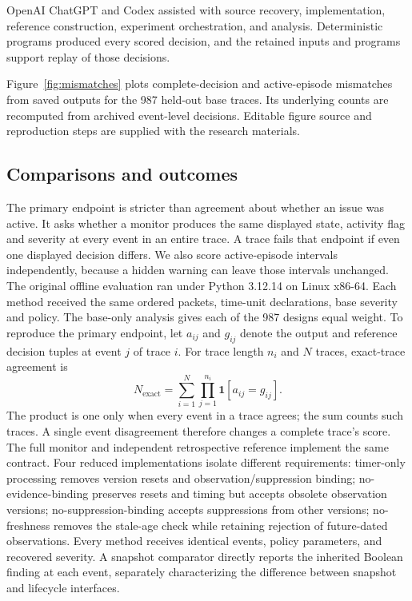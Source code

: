 \documentclass[preprint,11pt]{elsarticle}
\begin{document}
OpenAI ChatGPT and Codex assisted with source recovery, implementation, reference construction, experiment orchestration, and analysis. Deterministic programs produced every scored decision, and the retained inputs and programs support replay of those decisions.

Figure~\ref{fig:mismatches} plots complete-decision and active-episode mismatches from saved outputs for the 987 held-out base traces. Its underlying counts are recomputed from archived event-level decisions. Editable figure source and reproduction steps are supplied with the research materials.

\subsection{Comparisons and outcomes}
The primary endpoint is stricter than agreement about whether an issue was active. It asks whether a monitor produces the same displayed state, activity flag and severity at every event in an entire trace. A trace fails that endpoint if even one displayed decision differs. We also score active-episode intervals independently, because a hidden warning can leave those intervals unchanged. The original offline evaluation ran under Python 3.12.14 on Linux x86-64. Each method received the same ordered packets, time-unit declarations, base severity and policy. The base-only analysis gives each of the 987 designs equal weight. To reproduce the primary endpoint, let $a_{ij}$ and $g_{ij}$ denote the output and reference decision tuples at event $j$ of trace $i$. For trace length $n_i$ and $N$ traces, exact-trace agreement is
\[
N_{\mathrm{exact}}=\sum_{i=1}^{N}\prod_{j=1}^{n_i}\mathbf{1}[a_{ij}=g_{ij}].
\]
The product is one only when every event in a trace agrees; the sum counts such traces. A single event disagreement therefore changes a complete trace's score.
The full monitor and independent retrospective reference implement the same contract. Four reduced implementations isolate different requirements: timer-only processing removes version resets and observation/suppression binding; no-evidence-binding preserves resets and timing but accepts obsolete observation versions; no-suppression-binding accepts suppressions from other versions; no-freshness removes the stale-age check while retaining rejection of future-dated observations. Every method receives identical events, policy parameters, and recovered severity. A snapshot comparator directly reports the inherited Boolean finding at each event, separately characterizing the difference between snapshot and lifecycle interfaces.
\end{document}
